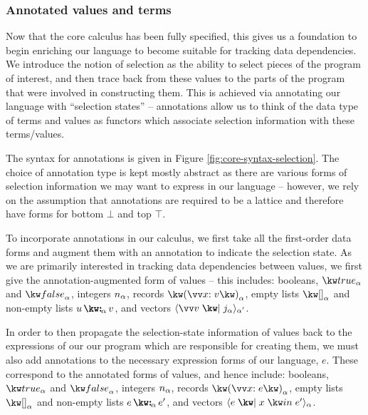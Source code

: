 

\subsubsection{Annotated values and terms}

Now that the core calculus has been fully specified, this gives us a foundation to begin enriching our language to become suitable for tracking data dependencies. We introduce the notion of selection as the ability to select pieces of the program of interest, and then trace back from these values to the parts of the program that were involved in constructing them. This is achieved via annotating our language with ``selection states'' -- annotations allow us to think of the data type of terms and values as functors which associate selection information with these terms/values. 



\noindent
The syntax for annotations is given in Figure \ref{fig:core-syntax-selection}. The choice of annotation type is kept mostly abstract as there are various forms of selection information we may want to express in our language -- however, we rely on the assumption that annotations are required to be a lattice and therefore have forms for bottom $\bot$ and top $\top$. 

To incorporate annotations in our calculus, we first take all the first-order data forms and augment them with an annotation to indicate the selection state. As we are primarily interested in tracking data dependencies between values, we first give the annotation-augmented form of values -- this includes: booleans, $\annTrue{\alpha}$ and $\annFalse{\alpha}$, integers $n_{\alpha}$, records $\annRec{\vec{\bind{x}{v}}}{\alpha}$, empty lists $\annNil{\alpha}$ and non-empty lists $\annCons{u}{v}{\alpha}$, and vectors $\annVecVal{\vec{v}}{\annInt{j}{\alpha}}{\smash{\alpha'}}$.

In order to then propagate the selection-state information of values back to the expressions of our our program which are responsible for creating them, we must also add annotations to the necessary expression forms of our language, $e$. These correspond to the annotated forms of values, and hence include: booleans, $\annTrue{\alpha}$ and $\annFalse{\alpha}$, integers $n_{\alpha}$, records $\annRec{\vec{\bind{x}{e}}}{\alpha}$, empty lists $\annNil{\alpha}$ and non-empty lists $\annCons{e}{e'}{\alpha}$, and vectors $\annVec{e}{x}{e'}{\alpha}$.

